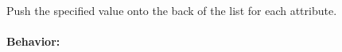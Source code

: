 Push the specified value onto the back of the list for each attribute.

\paragraph{Behavior:}
\begin{itemize}[noitemsep]

\end{itemize}
